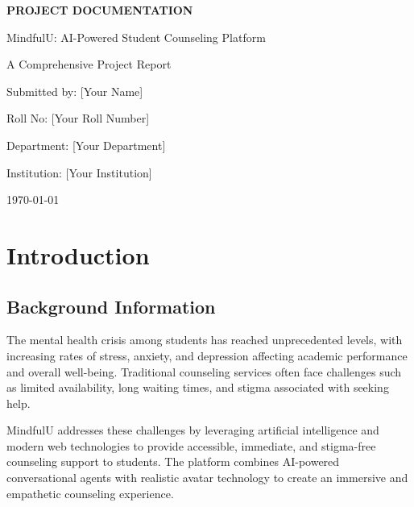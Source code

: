 \documentclass[11pt,a4paper]{article}
\begin{document}
\begin{titlepage}
    \centering
    \vspace*{2cm}
    {\Huge\bfseries PROJECT DOCUMENTATION\par}
    \vspace{1cm}
    {\LARGE MindfulU: AI-Powered Student Counseling Platform\par}
    \vspace{2cm}
    {\Large A Comprehensive Project Report\par}
    \vfill
    {\large Submitted by: [Your Name]\par}
    \vspace{0.5cm}
    {\large Roll No: [Your Roll Number]\par}
    \vspace{0.5cm}
    {\large Department: [Your Department]\par}
    \vspace{0.5cm}
    {\large Institution: [Your Institution]\par}
    \vfill
    {\large \today\par}
\end{titlepage}

\tableofcontents
\newpage

\section{Introduction}

\subsection{Background Information}
The mental health crisis among students has reached unprecedented levels, with increasing rates of stress, anxiety, and depression affecting academic performance and overall well-being. Traditional counseling services often face challenges such as limited availability, long waiting times, and stigma associated with seeking help.

MindfulU addresses these challenges by leveraging artificial intelligence and modern web technologies to provide accessible, immediate, and stigma-free counseling support to students. The platform combines AI-powered conversational agents with realistic avatar technology to create an immersive and empathetic counseling experience.
\end{document}
